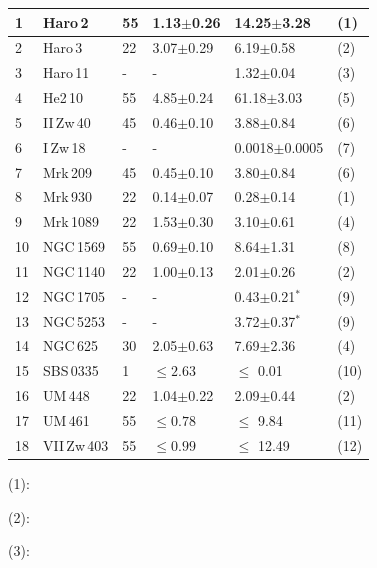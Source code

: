 \documentclass{aa}
\begin{document}
\begin{table}[t!]
\begin{threeparttable}
\begin{tabular}{p{}p{}p{}p{}p{}p{}}
\hline \hline
 1 & Haro\,2 & 55 & 1.13$\pm$0.26 & 14.25$\pm$3.28 & (1)\\
\hline
 2 & Haro\,3 & 22 & 3.07$\pm$0.29 & 6.19$\pm$0.58 & (2)\\
\hline
 3 & Haro\,11 & - & - & 1.32$\pm$0.04 & (3)\\
\hline
 4 & He2\,10 & 55 & 4.85$\pm$0.24 & 61.18$\pm$3.03 & (5)\\
\hline
 5 & II\,Zw\,40 & 45 & 0.46$\pm$0.10 & 3.88$\pm$0.84 & (6)\\
\hline
 6 & I\,Zw\,18 & - & - & 0.0018$\pm$0.0005 & (7)\\
\hline
 7 & Mrk\,209 & 45 & 0.45$\pm$0.10 & 3.80$\pm$0.84 & (6)\\
\hline
 8 & Mrk\,930 & 22 & 0.14$\pm$0.07 & 0.28$\pm$0.14 & (1)\\
\hline
 9 & Mrk\,1089 & 22 & 1.53$\pm$0.30 & 3.10$\pm$0.61 & (4)\\
\hline
 10 & NGC\,1569 & 55 & 0.69$\pm$0.10 & 8.64$\pm$1.31 & (8)\\
\hline
 11 & NGC\,1140 & 22 &  1.00$\pm$0.13 & 2.01$\pm$0.26 & (2)\\
\hline
 12 & NGC\,1705 & - & - & 0.43$\pm$0.21$^{*}$ & (9)\\
\hline
 13 & NGC\,5253 & - & - & 3.72$\pm$0.37$^{*}$ & (9)\\
\hline
 14 & NGC\,625 & 30 & 2.05$\pm$0.63 & 7.69$\pm$2.36 & (4)\\
\hline
 15 & SBS\,0335 & 1 & $\leq 2.63$ & $\leq$ 0.01 & (10)\\
\hline
 16 & UM\,448 & 22 & 1.04$\pm$0.22 & 2.09$\pm$0.44 & (2)\\
\hline
 17 & UM\,461 & 55 & $\leq 0.78$ & $\leq$ 9.84 & (11)\\
\hline
 18 & VII\,Zw\,403 & 55 & $\leq 0.99$ & $\leq$ 12.49 & (12)\\
\hline
\end{tabular}
\begin{tablenotes}
   \footnotesize
   \item (1): \cite{Thronson_Bally_1987}%
   \item (2): \cite{Hunt_2015}
   \item (3): \cite{Gao_Haro11_2022}

\end{tablenotes}
\end{threeparttable}
\end{table}
\end{document}
